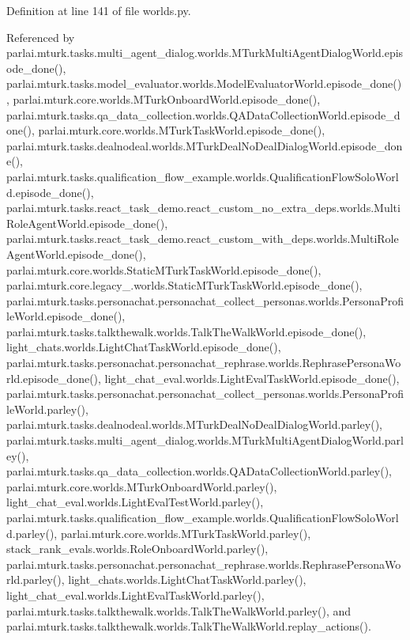 Definition at line 141 of file worlds.\+py.



Referenced by parlai.\+mturk.\+tasks.\+multi\+\_\+agent\+\_\+dialog.\+worlds.\+M\+Turk\+Multi\+Agent\+Dialog\+World.\+episode\+\_\+done(), parlai.\+mturk.\+tasks.\+model\+\_\+evaluator.\+worlds.\+Model\+Evaluator\+World.\+episode\+\_\+done(), parlai.\+mturk.\+core.\+worlds.\+M\+Turk\+Onboard\+World.\+episode\+\_\+done(), parlai.\+mturk.\+tasks.\+qa\+\_\+data\+\_\+collection.\+worlds.\+Q\+A\+Data\+Collection\+World.\+episode\+\_\+done(), parlai.\+mturk.\+core.\+worlds.\+M\+Turk\+Task\+World.\+episode\+\_\+done(), parlai.\+mturk.\+tasks.\+dealnodeal.\+worlds.\+M\+Turk\+Deal\+No\+Deal\+Dialog\+World.\+episode\+\_\+done(), parlai.\+mturk.\+tasks.\+qualification\+\_\+flow\+\_\+example.\+worlds.\+Qualification\+Flow\+Solo\+World.\+episode\+\_\+done(), parlai.\+mturk.\+tasks.\+react\+\_\+task\+\_\+demo.\+react\+\_\+custom\+\_\+no\+\_\+extra\+\_\+deps.\+worlds.\+Multi\+Role\+Agent\+World.\+episode\+\_\+done(), parlai.\+mturk.\+tasks.\+react\+\_\+task\+\_\+demo.\+react\+\_\+custom\+\_\+with\+\_\+deps.\+worlds.\+Multi\+Role\+Agent\+World.\+episode\+\_\+done(), parlai.\+mturk.\+core.\+worlds.\+Static\+M\+Turk\+Task\+World.\+episode\+\_\+done(), parlai.\+mturk.\+core.\+legacy\+\_.\+worlds.\+Static\+M\+Turk\+Task\+World.\+episode\+\_\+done(), parlai.\+mturk.\+tasks.\+personachat.\+personachat\+\_\+collect\+\_\+personas.\+worlds.\+Persona\+Profile\+World.\+episode\+\_\+done(), parlai.\+mturk.\+tasks.\+talkthewalk.\+worlds.\+Talk\+The\+Walk\+World.\+episode\+\_\+done(), light\+\_\+chats.\+worlds.\+Light\+Chat\+Task\+World.\+episode\+\_\+done(), parlai.\+mturk.\+tasks.\+personachat.\+personachat\+\_\+rephrase.\+worlds.\+Rephrase\+Persona\+World.\+episode\+\_\+done(), light\+\_\+chat\+\_\+eval.\+worlds.\+Light\+Eval\+Task\+World.\+episode\+\_\+done(), parlai.\+mturk.\+tasks.\+personachat.\+personachat\+\_\+collect\+\_\+personas.\+worlds.\+Persona\+Profile\+World.\+parley(), parlai.\+mturk.\+tasks.\+dealnodeal.\+worlds.\+M\+Turk\+Deal\+No\+Deal\+Dialog\+World.\+parley(), parlai.\+mturk.\+tasks.\+multi\+\_\+agent\+\_\+dialog.\+worlds.\+M\+Turk\+Multi\+Agent\+Dialog\+World.\+parley(), parlai.\+mturk.\+tasks.\+qa\+\_\+data\+\_\+collection.\+worlds.\+Q\+A\+Data\+Collection\+World.\+parley(), parlai.\+mturk.\+core.\+worlds.\+M\+Turk\+Onboard\+World.\+parley(), light\+\_\+chat\+\_\+eval.\+worlds.\+Light\+Eval\+Test\+World.\+parley(), parlai.\+mturk.\+tasks.\+qualification\+\_\+flow\+\_\+example.\+worlds.\+Qualification\+Flow\+Solo\+World.\+parley(), parlai.\+mturk.\+core.\+worlds.\+M\+Turk\+Task\+World.\+parley(), stack\+\_\+rank\+\_\+evals.\+worlds.\+Role\+Onboard\+World.\+parley(), parlai.\+mturk.\+tasks.\+personachat.\+personachat\+\_\+rephrase.\+worlds.\+Rephrase\+Persona\+World.\+parley(), light\+\_\+chats.\+worlds.\+Light\+Chat\+Task\+World.\+parley(), light\+\_\+chat\+\_\+eval.\+worlds.\+Light\+Eval\+Task\+World.\+parley(), parlai.\+mturk.\+tasks.\+talkthewalk.\+worlds.\+Talk\+The\+Walk\+World.\+parley(), and parlai.\+mturk.\+tasks.\+talkthewalk.\+worlds.\+Talk\+The\+Walk\+World.\+replay\+\_\+actions().

